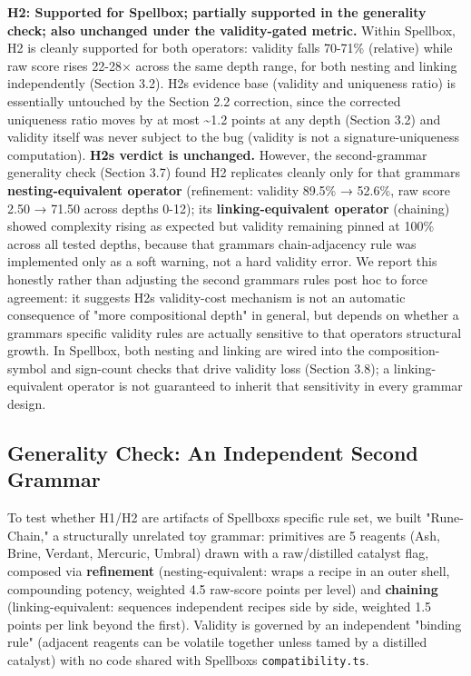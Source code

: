 \documentclass[
  10pt,
  twocolumn]{article}
\begin{document}
\textbf{H2: Supported for Spellbox; partially supported in the
generality check; also unchanged under the validity-gated metric.}
Within Spellbox, H2 is cleanly supported for both operators: validity
falls 70-71\% (relative) while raw score rises 22-28× across the same
depth range, for both nesting and linking independently (Section 3.2).
H2\textquotesingle s evidence base (validity and uniqueness ratio) is
essentially untouched by the Section 2.2 correction, since the corrected
uniqueness ratio moves by at most \textasciitilde1.2 points at any depth
(Section 3.2) and validity itself was never subject to the bug (validity
is not a signature-uniqueness computation). \textbf{H2\textquotesingle s
verdict is unchanged.} However, the second-grammar generality check
(Section 3.7) found H2 replicates cleanly only for that
grammar\textquotesingle s \textbf{nesting-equivalent operator}
(refinement: validity 89.5\% → 52.6\%, raw score 2.50 → 71.50 across
depths 0-12); its \textbf{linking-equivalent operator} (chaining) showed
complexity rising as expected but validity remaining pinned at 100\%
across all tested depths, because that grammar\textquotesingle s
chain-adjacency rule was implemented only as a soft warning, not a hard
validity error. We report this honestly rather than adjusting the second
grammar\textquotesingle s rules post hoc to force agreement: it suggests
H2\textquotesingle s validity-cost mechanism is not an automatic
consequence of "more compositional depth" in general, but depends on
whether a grammar\textquotesingle s specific validity rules are actually
sensitive to that operator\textquotesingle s structural growth. In
Spellbox, both nesting and linking are wired into the composition-symbol
and sign-count checks that drive validity loss (Section 3.8); a
linking-equivalent operator is not guaranteed to inherit that
sensitivity in every grammar design.

\subsection{Generality Check: An Independent Second
Grammar}\label{generality-check-an-independent-second-grammar}

To test whether H1/H2 are artifacts of Spellbox\textquotesingle s
specific rule set, we built "Rune-Chain," a structurally unrelated toy
grammar: primitives are 5 reagents (Ash, Brine, Verdant, Mercuric,
Umbral) drawn with a raw/distilled catalyst flag, composed via
\textbf{refinement} (nesting-equivalent: wraps a recipe in an outer
shell, compounding potency, weighted 4.5 raw-score points per level) and
\textbf{chaining} (linking-equivalent: sequences independent recipes
side by side, weighted 1.5 points per link beyond the first). Validity
is governed by an independent "binding rule" (adjacent reagents can be
volatile together unless tamed by a distilled catalyst) with no code
shared with Spellbox\textquotesingle s \texttt{compatibility.ts}.
\end{document}
